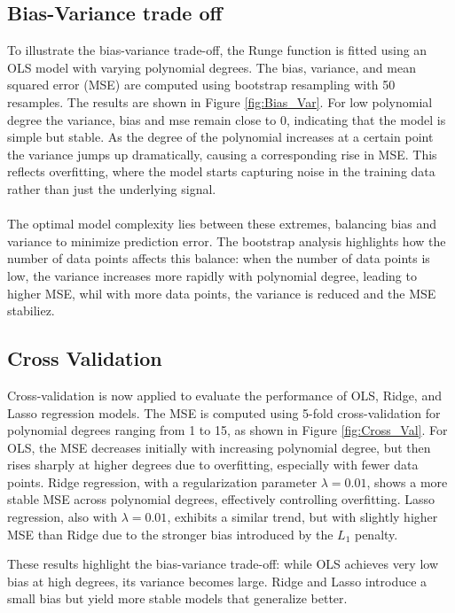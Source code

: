 \documentclass[
 reprint,            %
 amsmath,amssymb,
 aps,
]{revtex4-2}
\begin{document}
\subsection{Bias-Variance trade off}
\label{Bias-Variance trade off}
To illustrate the bias-variance trade-off, the Runge function is fitted using an OLS model with varying polynomial degrees. 
The bias, variance, and mean squared error (MSE) are computed using bootstrap resampling with 50 resamples. The results are shown in Figure \ref{fig:Bias_Var}.
For low polynomial degree the variance, bias and mse remain close to 0, indicating that the model is simple but stable.
As the degree of the polynomial increases at a certain point the variance jumps up dramatically, causing a corresponding rise in MSE.
This reflects overfitting, where the model starts capturing noise in the training data rather than just the underlying signal.\\\\
The optimal model complexity lies between these extremes, balancing bias and variance to minimize prediction error.
The bootstrap analysis highlights how the number of data points affects this balance: when the number of data points is low, the variance increases more rapidly with polynomial degree, leading to higher MSE, whil with more data points, the variance is reduced and the MSE stabiliez.\\


\subsection{Cross Validation}
\label{Cross Validation}
Cross-validation is now applied to evaluate the performance of OLS, Ridge, and Lasso regression models.
The MSE is computed using 5-fold cross-validation for polynomial degrees ranging from 1 to 15, as shown in Figure \ref{fig:Cross_Val}.
For OLS, the MSE decreases initially with increasing polynomial degree, but then rises sharply at higher degrees due to overfitting, especially with fewer data points.
Ridge regression, with a regularization parameter $\lambda = 0.01$, shows a more stable MSE across polynomial degrees, effectively controlling overfitting.
Lasso regression, also with $\lambda = 0.01$, exhibits a similar trend, but with slightly higher MSE than Ridge due to the stronger bias introduced by the $L_1$ penalty.       

These results highlight the bias-variance trade-off: while OLS achieves very low bias at high degrees, its variance becomes large.
Ridge and Lasso introduce a small bias but yield more stable models that generalize better.

\end{document}
